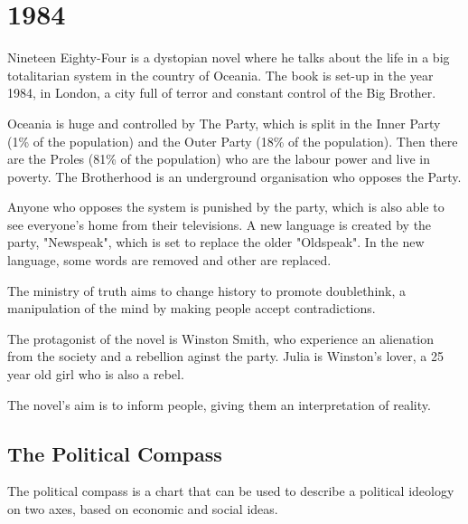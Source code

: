\documentclass{article}
\begin{document}
    \section{1984}
    Nineteen Eighty-Four is a dystopian novel where he talks about the life in a big totalitarian system in the country of Oceania. The book is set-up in the year 1984, in London, a city full of terror and constant control of the Big Brother.

    Oceania is huge and controlled by The Party, which is split in the Inner Party (1\% of the population) and the Outer Party (18\% of the population). Then there are the Proles (81\% of the population) who are the labour power and live in poverty. The Brotherhood is an underground organisation who opposes the Party.

    Anyone who opposes the system is punished by the party, which is also able to see everyone's home from their televisions. A new language is created by the party, "Newspeak", which is set to replace the older "Oldspeak". In the new language, some words are removed and other are replaced.

    The ministry of truth aims to change history to promote doublethink, a manipulation of the mind by making people accept contradictions.

    The protagonist of the novel is Winston Smith, who experience an alienation from the society and a rebellion aginst the party. Julia is Winston's lover, a 25 year old girl who is also a rebel.

    The novel's aim is to inform people, giving them an interpretation of reality.

    \subsection{The Political Compass}

    The political compass is a chart that can be used to describe a political ideology on two axes, based on economic and social ideas.
\end{document}
